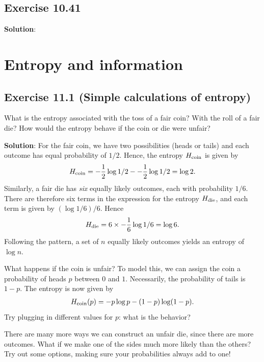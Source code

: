 \documentclass{book}
\begin{document}
\section*{Exercise 10.41}
    

    \textbf{Solution}:
    
\chapter{Entropy and information}

\section*{Exercise 11.1 (Simple calculations of entropy)}
    What is the entropy associated with the toss of a fair coin? With the roll of a fair die? How would the entropy behave if the coin or die were unfair?
    
    \textbf{Solution}: For the fair coin, we have two possibilities (heads or tails) and each outcome has equal probability of $1/2$. Hence, the entropy $H_{\rm{coin}}$ is given by
    \begin{align}
        H_{\rm{coin}} = -\frac{1}{2}\log1/2--\frac{1}{2}\log1/2 = \log 2.
    \end{align}
    Similarly, a fair die has \emph{six} equally likely outcomes, each with probability $1/6$. There are therefore six terms in the expression for the entropy $H_{\rm{die}}$, and each term is given by $(\log 1/6)/6$. Hence
    \begin{align}
        H_{\rm{die}} = 6 \times -\frac{1}{6}\log 1/6 = \log 6.
    \end{align}
    Following the pattern, a set of $n$ equally likely outcomes yields an entropy of $\log n$. 
    
    What happens if the coin is unfair? To model this, we can assign the coin a probability of heads $p$ between $0$ and $1$. Necessarily, the probability of tails is $1-p$. The entropy is now given by
    \begin{align}
        H_{\rm{coin}} (p) = -p\log p - (1-p) \log (1-p).
    \end{align}
    Try plugging in different values for $p$: what is the behavior? 
    
    There are many more ways we can construct an unfair die, since there are more outcomes. What if we make one of the sides much more likely than the others? Try out some options, making sure your probabilities always add to one!
\end{document}
